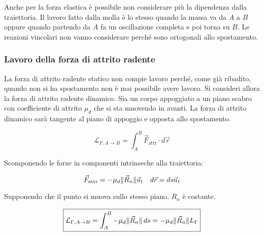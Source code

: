 \begin{figure}[htpb]
\end{figure}
\FloatBarrier
Anche per la forza elastica è possibile non considerare più la dipendenza dalla traiettoria. Il lavoro fatto dalla molla è lo stesso quando la massa va da $A$ a $B$ oppure quando partendo da $A$ fa un oscillazione completa
e poi torna su $B$. Le reazioni vincolari non vanno considerare perché sono ortogonali allo spostamento.

\subsubsection{Lavoro della forza di attrito radente}

La forza di attrito radente statico non compie lavoro perché, come già ribadito, quando non si ha spostamento non è mai possibile avere lavoro. Si consideri allora la forza di attrito radente dinamico. Sia un corpo appoggiato a un piano scabro con coefficiente di attrito $\mu_d$ che si sta muovendo in avanti. La forza di attrito dinamico sarà tangente al piano di appoggio e opposta allo spostamento.

\[
	\mathcal{L}_{\Gamma, A \to B}=\int_A^B \vec{F}_{\text{attr}} \cdot d\vec{r}
\]

Scomponendo le forze in componenti intrinseche alla traiettoria:

\[
	\vec{F}_{\text{attr}}=-\mu_d\lVert\vec{R}_n\rVert \vec{u}_t \quad d\vec{r}=ds\vec{u}_t
\]

Supponendo che il punto si muova sullo stesso piano, $R_n$ è costante.

\[
	\boxed{\mathcal{L}_{\Gamma, A \to B}=\int_A^B -\mu_d\lVert\vec{R}_n\rVert \,ds=-\mu_d\lVert\vec{R}_n\rVert L_\Gamma}
\]

